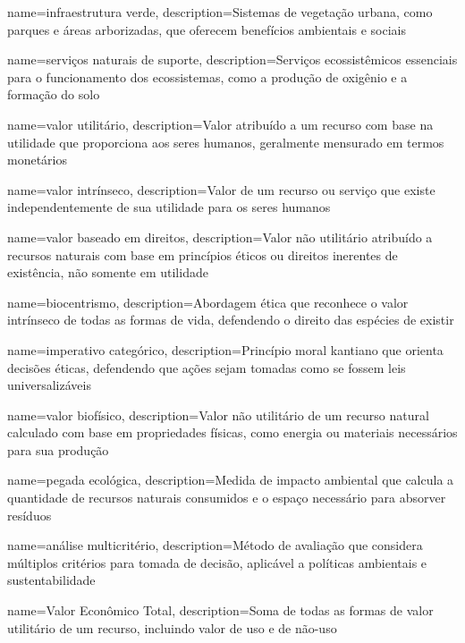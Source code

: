 {
	name=infraestrutura verde,
	description={Sistemas de vegetação urbana, como parques e áreas arborizadas, que oferecem benefícios ambientais e sociais}
}

{
	name=serviços naturais de suporte,
	description={Serviços ecossistêmicos essenciais para o funcionamento dos ecossistemas, como a produção de oxigênio e a formação do solo}
}

{
	name=valor utilitário,
	description={Valor atribuído a um recurso com base na utilidade que proporciona aos seres humanos, geralmente mensurado em termos monetários}
}

{
	name=valor intrínseco,
	description={Valor de um recurso ou serviço que existe independentemente de sua utilidade para os seres humanos}
}

{
	name=valor baseado em direitos,
	description={Valor não utilitário atribuído a recursos naturais com base em princípios éticos ou direitos inerentes de existência, não somente em utilidade}
}

{
	name=biocentrismo,
	description={Abordagem ética que reconhece o valor intrínseco de todas as formas de vida, defendendo o direito das espécies de existir}
}

{
	name=imperativo categórico,
	description={Princípio moral kantiano que orienta decisões éticas, defendendo que ações sejam tomadas como se fossem leis universalizáveis}
}

{
	name=valor biofísico,
	description={Valor não utilitário de um recurso natural calculado com base em propriedades físicas, como energia ou materiais necessários para sua produção}
}

{
	name=pegada ecológica,
	description={Medida de impacto ambiental que calcula a quantidade de recursos naturais consumidos e o espaço necessário para absorver resíduos}
}

{
	name=análise multicritério,
	description={Método de avaliação que considera múltiplos critérios para tomada de decisão, aplicável a políticas ambientais e sustentabilidade}
}

{
	name=Valor Econômico Total,
	description={Soma de todas as formas de valor utilitário de um recurso, incluindo valor de uso e de não-uso}
}

